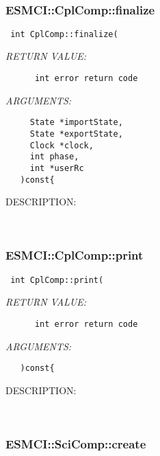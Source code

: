    
 
\mbox{}\hrulefill\
 
\subsubsection [ESMCI::CplComp::finalize] {ESMCI::CplComp::finalize}


  
\begin{verbatim} int CplComp::finalize(\end{verbatim}{\em RETURN VALUE:}
\begin{verbatim}      int error return code\end{verbatim}{\em ARGUMENTS:}
\begin{verbatim}     State *importState,
     State *exportState,
     Clock *clock,
     int phase,
     int *userRc
   )const{\end{verbatim}
{\sf DESCRIPTION:\\ }


   
 
\mbox{}\hrulefill\
 
\subsubsection [ESMCI::CplComp::print] {ESMCI::CplComp::print}


  
\begin{verbatim} int CplComp::print(\end{verbatim}{\em RETURN VALUE:}
\begin{verbatim}      int error return code\end{verbatim}{\em ARGUMENTS:}
\begin{verbatim}   )const{\end{verbatim}
{\sf DESCRIPTION:\\ }


   
 
\mbox{}\hrulefill\
 
\subsubsection [ESMCI::SciComp::create] {ESMCI::SciComp::create}


